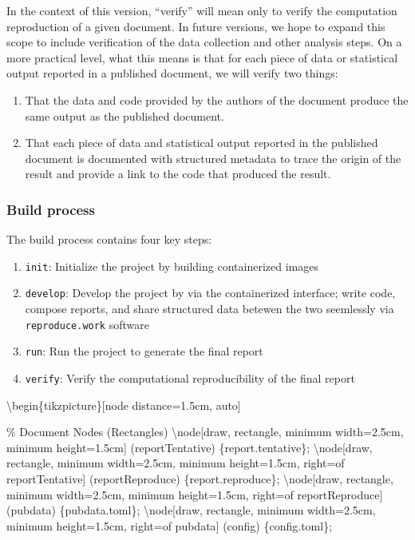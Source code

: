 In the context of this version, ``verify'' will mean only to verify the computation reproduction of a given document. In future versions, we hope to expand this scope to include verification of the data collection and other analysis steps. On a more practical level, what this means is that for each piece of data or statistical output reported in a published document, we will verify two things:

\begin{enumerate}
\itemsep -0.2em
\item That the data and code provided by the authors of the document produce the same output as the published document.
\item That each piece of data and statistical output reported in the published document is documented with structured metadata to trace the origin of the result and provide a link to the code that produced the result.
\end{enumerate}

\hypertarget{build-process}{%
\subsubsection{Build process}\label{build-process}}

The build process contains four key steps: 

\begin{enumerate}
\itemsep -0.2em
\item \texttt{init}: Initialize the project by building containerized images
\item \texttt{develop}: Develop the project by via the containerized interface; write code, compose reports, and share structured data betewen the two seemlessly via \texttt{reproduce.work} software
\item \texttt{run}: Run the project to generate the final report
\item \texttt{verify}: Verify the computational reproducibility of the final report
\end{enumerate}

\textbackslash{}begin\{tikzpicture\}[node distance=1.5cm, auto]

\% Document Nodes (Rectangles)
\textbackslash{}node[draw, rectangle, minimum width=2.5cm, minimum height=1.5cm] (reportTentative) \{report.tentative\};
\textbackslash{}node[draw, rectangle, minimum width=2.5cm, minimum height=1.5cm, right=of reportTentative] (reportReproduce) \{report.reproduce\};
\textbackslash{}node[draw, rectangle, minimum width=2.5cm, minimum height=1.5cm, right=of reportReproduce] (pubdata) \{pubdata.toml\};
\textbackslash{}node[draw, rectangle, minimum width=2.5cm, minimum height=1.5cm, right=of pubdata] (config) \{config.toml\};

